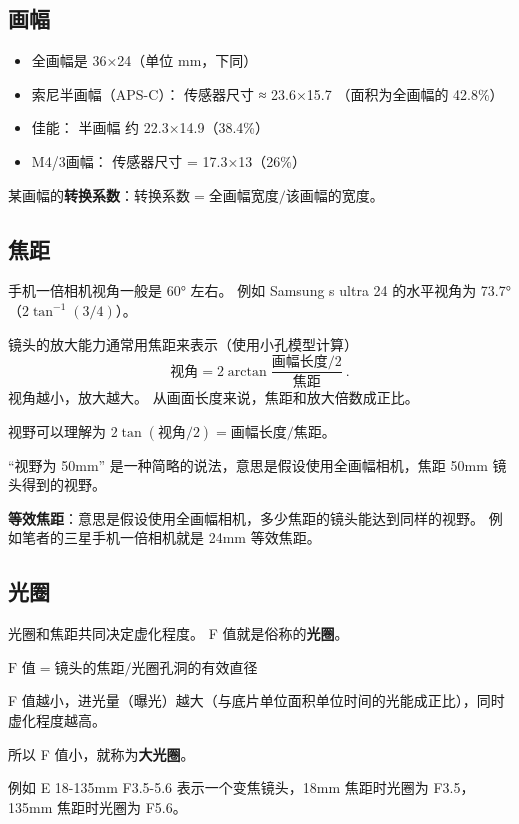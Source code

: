 
\subsection{画幅}
\begin{itemize}
\item 全画幅是 36×24（单位 mm，下同）
\item 索尼半画幅（APS-C）： 传感器尺寸 ≈ 23.6×15.7 （面积为全画幅的 42.8\%）
\item 佳能： 半画幅 约 22.3×14.9（38.4\%）
\item M4/3画幅： 传感器尺寸 = 17.3×13（26\%）
\end{itemize}

某画幅的\textbf{转换系数}：$\text{转换系数} = \text{全画幅宽度}/\text{该画幅的宽度}$。

\subsection{焦距}
手机一倍相机视角一般是 60° 左右。 例如 Samsung s ultra 24 的水平视角为 73.7°（$2\tan^{-1}(3/4)$）。

镜头的放大能力通常用焦距来表示（使用小孔模型计算）
\begin{equation}
\text{视角} = 2\arctan{\frac{\text{画幅长度/2}}{\text{焦距}}}~.
\end{equation}
视角越小，放大越大。 从画面长度来说，焦距和放大倍数成正比。

视野可以理解为 $2\tan(\text{视角}/2) = \text{画幅长度}/{\text{焦距}}$。

“视野为 50mm” 是一种简略的说法，意思是假设使用全画幅相机，焦距 50mm 镜头得到的视野。

\textbf{等效焦距}：意思是假设使用全画幅相机，多少焦距的镜头能达到同样的视野。 例如笔者的三星手机一倍相机就是 24mm 等效焦距。


\subsection{光圈}
光圈和焦距共同决定虚化程度。 F 值就是俗称的\textbf{光圈}。

$\text{F 值} = \text{镜头的焦距}/\text{光圈孔洞的有效直径}$

F 值越小，进光量（曝光）越大（与底片单位面积单位时间的光能成正比），同时虚化程度越高。

所以 F 值小，就称为\textbf{大光圈}。

例如 E 18-135mm F3.5-5.6 表示一个变焦镜头，18mm 焦距时光圈为 F3.5， 135mm 焦距时光圈为 F5.6。
